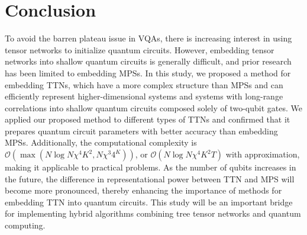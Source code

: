 \documentclass[12pt,dvipdfmx,twoside,openright]{report}
\begin{document}
\chapter{Conclusion}
To avoid the barren plateau issue in VQAs, there is increasing interest in using tensor networks to initialize quantum circuits. 
However, embedding tensor networks into shallow quantum circuits is generally difficult, and prior research has been limited to embedding MPSs.
In this study, we proposed a method for embedding TTNs, which have a more complex structure than MPSs and can efficiently represent higher-dimensional systems and systems with long-range correlations into shallow quantum circuits composed solely of two-qubit gates.
We applied our proposed method to different types of TTNs and confirmed that it prepares quantum circuit parameters with better accuracy than embedding MPSs.
Additionally, the computational complexity is $\mathcal{O}(\max (N\log{N}\chi^4 K^2, N\chi^3 4^K))$, or $\mathcal{O}(N\log{N}\chi^4 K^2T)$ with approximation, making it applicable to practical problems.
As the number of qubits increases in the future, the difference in representational power between TTN and MPS will become more pronounced, thereby enhancing the importance of methods for embedding TTN into quantum circuits.
This study will be an important bridge for implementing hybrid algorithms combining tree tensor networks and quantum computing.

\cleardoublepage
{}


\end{document}
